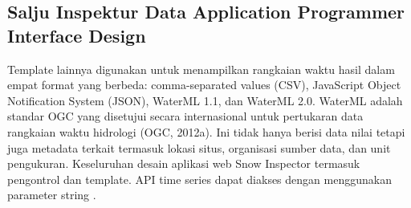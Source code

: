 \subsection{Salju Inspektur Data Application Programmer Interface Design}

Template lainnya digunakan untuk menampilkan rangkaian waktu hasil dalam empat format yang berbeda: comma-separated values (CSV), JavaScript Object Notification System (JSON), WaterML 1.1, dan WaterML 2.0. WaterML adalah standar OGC yang disetujui secara internasional untuk pertukaran data rangkaian waktu hidrologi (OGC, 2012a). Ini tidak hanya berisi data nilai tetapi juga metadata terkait termasuk lokasi situs, organisasi sumber data, dan unit pengukuran. Keseluruhan desain aplikasi web Snow Inspector termasuk pengontrol dan template. API time series dapat diakses dengan menggunakan parameter string \cite{Kadlec2016Extracting}. 



